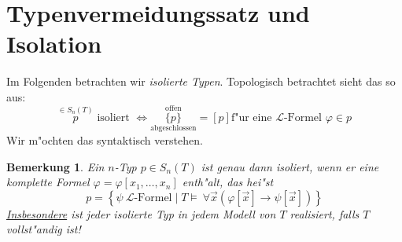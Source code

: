 \documentclass[a4paper,12pt,numbers=noenddot,parskip=full]{scrartcl}
\newcommand{\Forall}{~\forall}
\newcommand{\scrL}{\mathcal{L}}
\theoremstyle{dotless}
\newtheorem{remark}[theorem]{Bemerkung}
\begin{document}
\section{Typenvermeidungssatz und Isolation}
Im Folgenden betrachten wir \emph{isolierte Typen}. Topologisch betrachtet sieht das so aus:
\begin{equation*}
	\overset{\in S_n(T)}{p} \text{ isoliert } \Longleftrightarrow \underset{\text{abgeschlossen}}{\overset{\text{offen}}{\{p\}}} = [p] \text{f"ur eine } \scrL \text{-Formel } \varphi \in p
\end{equation*}
Wir m"ochten das syntaktisch verstehen.
\begin{remark}\label{bem:voll}
	Ein $n$-Typ $p \in S_n(T)$ ist genau dann isoliert, wenn er eine \emph{komplette} Formel $\varphi =\varphi[x_1, \dots, x_n]$ enth"alt, das hei"st
	\begin{equation*}
		p = \left\{\psi~ \scrL\text{-Formel} \mid T \models \Forall \vec{x} (\varphi[\vec{x}] \rightarrow \psi[\vec{x}]) \right\}
	\end{equation*}
	\underline{Insbesondere} ist jeder isolierte Typ in jedem Modell von $T$ realisiert, falls $T$ vollst"andig ist!
\end{remark}
\end{document}
